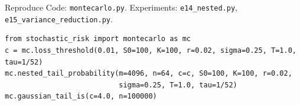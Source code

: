 \documentclass[aspectratio=169,10pt]{beamer}
\begin{document}
\begin{frame}[fragile]{Reproduce}
  \small
  Code: \texttt{montecarlo.py}. Experiments: \texttt{e14\_nested.py}, \texttt{e15\_variance\_reduction.py}.
\begin{verbatim}
from stochastic_risk import montecarlo as mc
c = mc.loss_threshold(0.01, S0=100, K=100, r=0.02, sigma=0.25, T=1.0, tau=1/52)
mc.nested_tail_probability(m=4096, n=64, c=c, S0=100, K=100, r=0.02,
                           sigma=0.25, T=1.0, tau=1/52)
mc.gaussian_tail_is(c=4.0, n=100000)
\end{verbatim}
\end{frame}

\deckreferences
\end{document}
